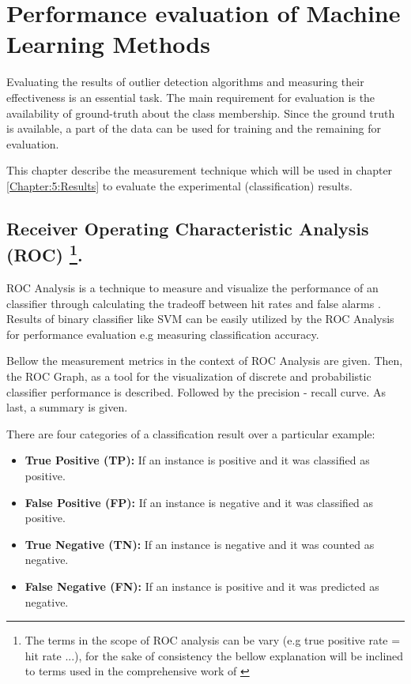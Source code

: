 \chapter{Performance evaluation of Machine Learning Methods}\label{Chapter:4}


Evaluating the results of outlier detection algorithms and measuring their effectiveness is an essential task. The main requirement for evaluation is the availability of ground-truth about the class membership. Since the ground truth is available, a part of the data can be used for training and the remaining for evaluation. 

This chapter describe the measurement technique which will be used in chapter \ref{Chapter:5:Results} to evaluate the experimental (classification) results. 

\section[Receiver Operating Characteristic Analysis (ROC)] {Receiver Operating Characteristic Analysis (ROC) \footnote{The terms in the scope of ROC analysis can be vary (e.g true positive rate = hit rate ...), for the sake of consistency the bellow explanation will be inclined to terms used in the comprehensive work of \cite{Fawcett:2006:IRA:1159473.1159475}}.}\label{Chapter:4:ROC}

ROC Analysis is a technique to measure and visualize the performance of an classifier through calculating the tradeoff between hit rates and false alarms \cite{Fawcett:2006:IRA:1159473.1159475}. Results of binary classifier like SVM can be easily utilized by the ROC Analysis for performance evaluation e.g measuring classification accuracy.

Bellow the measurement metrics in the context of ROC Analysis are given. Then, the ROC Graph, as a tool for the visualization of discrete and probabilistic classifier performance is described. Followed by the precision - recall curve. As last, a summary is given.

There are four categories of a classification result over a particular example:

\begin{itemize}
    \item \textbf{True Positive (TP): }  If an instance is positive and it was classified as positive.
      \item \textbf{False Positive (FP): }  If an instance is negative and it was classified as positive.
    \item \textbf{True Negative (TN):}  If an instance is negative and it was counted as negative.
    \item \textbf{False Negative (FN):}  If an instance is positive and it was predicted as negative.
\end{itemize}

